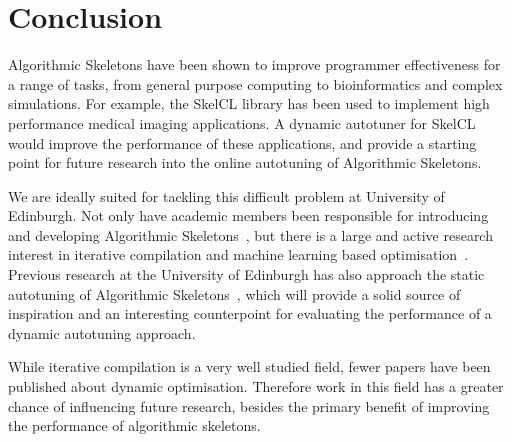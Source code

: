 \section{Conclusion}

Algorithmic Skeletons have been shown to improve programmer
effectiveness for a range of tasks, from general purpose computing to
bioinformatics and complex simulations. For example, the SkelCL
library has been used to implement high performance medical imaging
applications. A dynamic autotuner for SkelCL would improve the
performance of these applications, and provide a starting point for
future research into the online autotuning of Algorithmic Skeletons.

We are ideally suited for tackling this difficult problem at
University of Edinburgh. Not only have academic members been
responsible for introducing and developing Algorithmic
Skeletons~\cite{Cole1989, Cole2004, Benoit2005a}, but there is a large
and active research interest in iterative compilation and machine
learning based optimisation~\cite{Fursin2008, Agakov,
Fursin2005}. Previous research at the University of Edinburgh has also
approach the static autotuning of Algorithmic
Skeletons~\cite{Collins2012, Collins2013}, which will provide a solid
source of inspiration and an interesting counterpoint for evaluating
the performance of a dynamic autotuning approach.

While iterative compilation is a very well studied field, fewer papers
have been published about dynamic optimisation. Therefore work in this
field has a greater chance of influencing future research, besides the
primary benefit of improving the performance of algorithmic skeletons.


